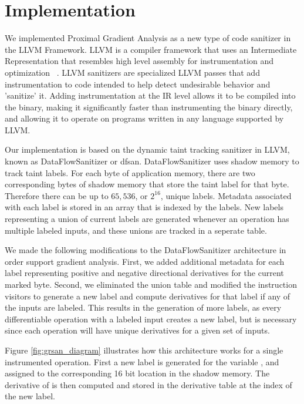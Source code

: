 \section{Implementation}

We implemented Proximal Gradient Analysis as a new type of code sanitizer in the LLVM Framework. LLVM is a compiler framework that uses an Intermediate Representation that resembles high level assembly for instrumentation and optimization ~\cite{llvm2004}. LLVM sanitizers are specialized LLVM passes that add instrumentation to code intended to help detect undesirable behavior and 'sanitize' it. Adding instrumentation at the IR level allows it to be compiled into the binary, making it significantly faster than instrumenting the binary directly, and allowing it to operate on programs written in any language supported by LLVM.

Our implementation is based on the dynamic taint tracking sanitizer in LLVM, known as DataFlowSanitizer or dfsan. DataFlowSanitizer uses shadow memory to track taint labels. For each byte of application memory, there are two corresponding bytes of shadow memory that store the taint label for that byte. Therefore there can be up to $65,536$, or $2^{16}$, unique labels. Metadata associated with each label is stored in an array that is indexed by the labels. New labels representing a union of current labels are generated whenever an operation has multiple labeled inputs, and these unions are tracked in a seperate  table.

We made the following modifications to the DataFlowSanitizer architecture in order support gradient analysis. First, we added additional metadata for each label representing positive and negative directional derivatives for the current marked byte. Second, we eliminated the union table and modified the instruction visitors to generate a new label and compute derivatives for that label if any of the inputs are labeled.  This results in the generation of more labels, as every differentiable operation with a labeled input creates a new label, but is necessary since each operation will have unique derivatives for a given set of inputs. 

Figure \ref{fig:grsan_diagram} illustrates how this architecture works for a single instrumented operation. First a new label is generated for the variable , and assigned to the corresponding 16 bit location in the shadow memory. The derivative of  is then computed and stored in the derivative table at the index of the new label.

